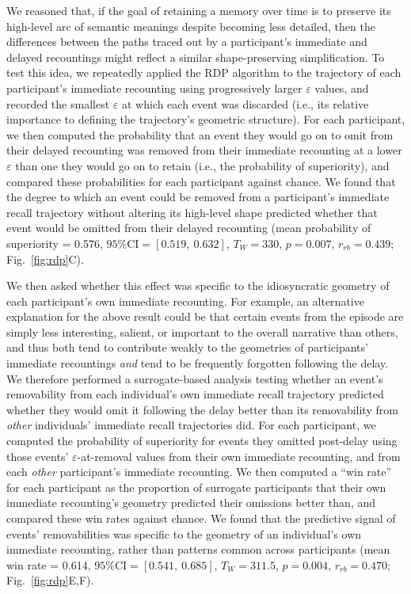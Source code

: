 \documentclass[10pt]{article}
\begin{document}
We reasoned that, if the goal of retaining a memory over time is to preserve its high-level arc of semantic meanings despite becoming less detailed, then the differences between the paths traced out by a participant's immediate and delayed recountings might reflect a similar shape-preserving simplification.
To test this idea, we repeatedly applied the RDP algorithm to the trajectory of each participant's immediate recounting using progressively larger $\varepsilon$ values, and recorded the smallest $\varepsilon$ at which each event was discarded (i.e., its relative importance to defining the trajectory's geometric structure).
For each participant, we then computed the probability that an event they would go on to omit from their delayed recounting was removed from their immediate recounting at a lower $\varepsilon$ than one they would go on to retain (i.e., the probability of superiority), and compared these probabilities for each participant against chance.
We found that the degree to which an event could be removed from a participant's immediate recall trajectory without altering its high-level shape predicted whether that event would be omitted from their delayed recounting (mean probability of superiority = 0.576, $\text{95\% CI} = \left[0.519,~0.632\right]$, $T_W = 330$, $p = 0.007$, $r_{rb} = 0.439$; Fig.~\ref{fig:rdp}C).

We then asked whether this effect was specific to the idiosyncratic geometry of each participant's own immediate recounting.
For example, an alternative explanation for the above result could be that certain events from the episode are simply less interesting, salient, or important to the overall narrative than others, and thus both tend to contribute weakly to the geometries of participants' immediate recountings \textit{and} tend to be frequently forgotten following the delay.
We therefore performed a surrogate-based analysis testing whether an event's removability from each individual's own immediate recall trajectory predicted whether they would omit it following the delay better than its removability from \textit{other} individuals' immediate recall trajectories did.
For each participant, we computed the probability of superiority for events they omitted post-delay using those events' $\varepsilon$-at-removal values from their own immediate recounting, and from each \textit{other} participant's immediate recounting.
We then computed a ``win rate'' for each participant as the proportion of surrogate participants that their own immediate recounting's geometry predicted their omissions better than, and compared these win rates against chance.
We found that the predictive signal of events' removabilities was specific to the geometry of an individual's own immediate recounting, rather than patterns common across participants (mean win rate = 0.614, $\text{95\% CI} = \left[0.541,~0.685\right]$, $T_W = 311.5$, $p = 0.004$, $r_{rb} = 0.470$; Fig.~\ref{fig:rdp}E,F).
\end{document}
